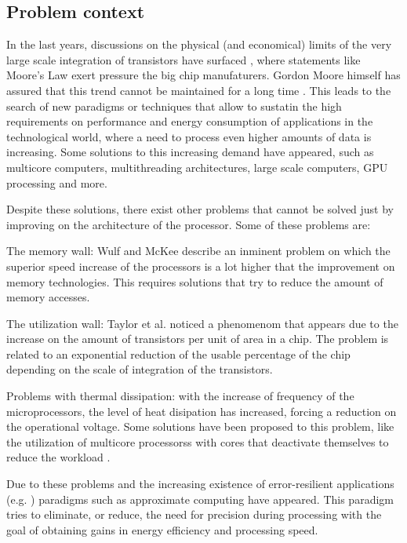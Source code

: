 \subsection{Problem context}

In the last years, discussions on the physical (and economical) limits of the very large scale integration 
of transistors have surfaced \cite{aftermoore}\cite{moorelawlimit}, where statements like Moore's Law exert pressure the big chip manufaturers.
Gordon Moore himself has assured that this trend cannot be maintained for a long time \cite{mooredead}. This leads to the
search of new paradigms or techniques that allow to sustatin the high requirements on performance and 
energy consumption of applications in the technological world, where a need to process even higher amounts
of data is increasing. Some solutions to this increasing demand have appeared, such as multicore computers,
multithreading architectures, large scale computers, GPU processing and more.

Despite these solutions, there exist other problems that cannot be solved just by improving on the architecture
of the processor. Some of these problems are:

\begin{compactitem}
    \item The memory wall: Wulf and McKee\cite{memorywall} describe an inminent problem on which the superior speed increase
    of the processors is a lot higher that the improvement on memory technologies. This requires solutions that
    try to reduce the amount of memory accesses.
    \item The utilization wall: Taylor et al.\cite{utilizationwall} noticed a phenomenom that appears due to the increase on the amount
    of transistors per unit of area in a chip. The problem is related to an exponential reduction of the usable
    percentage of the chip depending on the scale of integration of the transistors.
    \item Problems with thermal dissipation: with the increase of frequency of the microprocessors, the level of 
    heat disipation has increased, forcing a reduction on the operational voltage. Some solutions have been proposed
    to this problem, like the utilization of multicore processorss with cores that deactivate themselves to reduce
    the workload \cite{whitepaper}.
\end{compactitem}

Due to these problems and the increasing existence of error-resilient applications (e.g. \cite{errortolerant}) paradigms such as
approximate computing have appeared. This paradigm tries to eliminate, or reduce, the need for precision
during processing with the goal of obtaining gains in energy efficiency and processing speed.

